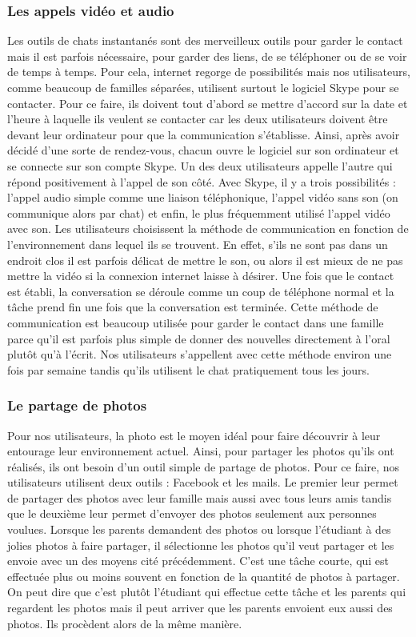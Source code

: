 \documentclass[12pt]{article}
\begin{document}
\subsubsection{Les appels vidéo et audio}
Les outils de chats instantanés sont des merveilleux outils pour garder le contact mais il est parfois nécessaire, pour garder des liens, de se téléphoner ou de se voir de temps à temps. Pour cela, internet regorge de possibilités mais nos utilisateurs, comme beaucoup de familles séparées, utilisent surtout le logiciel Skype pour se contacter. 
Pour ce faire, ils doivent tout d'abord se mettre d'accord sur la date et l'heure à laquelle ils veulent se contacter car les deux utilisateurs doivent être devant leur ordinateur pour que la communication s'établisse. Ainsi, après avoir décidé d'une sorte de rendez-vous, chacun ouvre le logiciel sur son ordinateur et se connecte sur son compte Skype. Un des deux utilisateurs appelle l'autre qui répond positivement à l'appel de son côté. Avec Skype, il y a trois possibilités :  l'appel audio simple comme une liaison téléphonique, l'appel vidéo sans son (on communique alors par chat) et enfin, le plus fréquemment utilisé l'appel vidéo avec son. Les utilisateurs choisissent la méthode de communication en fonction de l'environnement dans lequel ils se trouvent. En effet, s'ils ne sont pas dans un endroit clos il est parfois délicat de mettre le son, ou alors il est mieux de ne pas mettre la vidéo si la connexion internet laisse à désirer. Une fois que le contact est établi, la conversation se déroule comme un coup de téléphone normal et la tâche prend fin une fois que la conversation est terminée. Cette méthode de communication est beaucoup utilisée pour garder le contact dans une famille parce qu'il est parfois plus simple de donner des nouvelles directement à l'oral plutôt qu'à l'écrit. Nos utilisateurs s'appellent avec cette méthode environ une fois par semaine tandis qu'ils utilisent le chat pratiquement tous les jours.~\\

\subsubsection{Le partage de photos}
Pour nos utilisateurs, la photo est le moyen idéal pour faire découvrir à leur entourage leur environnement actuel. Ainsi, pour partager les photos qu'ils ont réalisés, ils ont besoin d'un outil simple de partage de photos. Pour ce faire, nos utilisateurs utilisent deux outils : Facebook et les mails. Le premier leur permet de partager des photos avec leur famille mais aussi avec tous leurs amis tandis que le deuxième leur permet d'envoyer des photos seulement aux personnes voulues. Lorsque les parents demandent des photos ou lorsque l'étudiant à des jolies photos à faire partager, il sélectionne les photos qu'il veut partager et les envoie avec un des moyens cité précédemment. C'est une tâche courte, qui est effectuée plus ou moins souvent en fonction de la quantité de photos à partager. On peut dire que c'est plutôt l'étudiant qui effectue cette tâche et les parents qui regardent les photos mais il peut arriver que les parents envoient eux aussi des photos. Ils procèdent alors de la même manière.~\\
\end{document}
